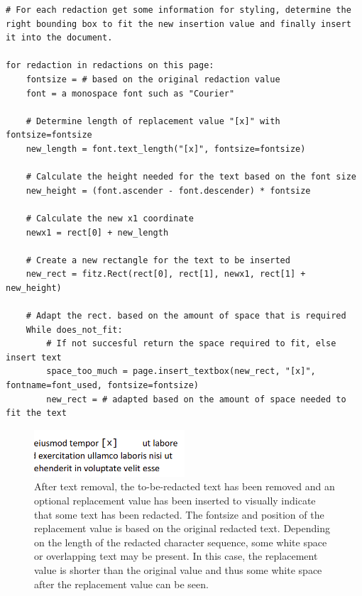 \begin{lstlisting}[style=CStyle, caption=Pseudocode for adding replacement text in place for the redacted text. The style of the replacement text is based on the original text. The bounding box which is used to insert the text in the document may be adapted to fit the text and position it correctly relative to other text.]
# For each redaction get some information for styling, determine the right bounding box to fit the new insertion value and finally insert it into the document.

for redaction in redactions on this page:
    fontsize = # based on the original redaction value
    font = a monospace font such as "Courier"

    # Determine length of replacement value "[x]" with fontsize=fontsize
    new_length = font.text_length("[x]", fontsize=fontsize)

    # Calculate the height needed for the text based on the font size
    new_height = (font.ascender - font.descender) * fontsize

    # Calculate the new x1 coordinate
    newx1 = rect[0] + new_length

    # Create a new rectangle for the text to be inserted
    new_rect = fitz.Rect(rect[0], rect[1], newx1, rect[1] + new_height)

    # Adapt the rect. based on the amount of space that is required
    While does_not_fit:
        # If not succesful return the space required to fit, else insert text
        space_too_much = page.insert_textbox(new_rect, "[x]", fontname=font_used, fontsize=fontsize)
        new_rect = # adapted based on the amount of space needed to fit the text

\end{lstlisting}

\begin{figure}[h]
\includegraphics[width=0.5\textwidth]{latex/media/redactreplace.png}
\centering
\caption{After text removal, the to-be-redacted text has been removed and an optional replacement value has been inserted to visually indicate that some text has been redacted. The fontsize and position of the replacement value is based on the original redacted text. Depending on the length of the redacted character sequence, some white space or overlapping text may be present. In this case, the replacement value is shorter than the original value and thus some white space after the replacement value can be seen.}
\label{fig:replacement}
\end{figure}

